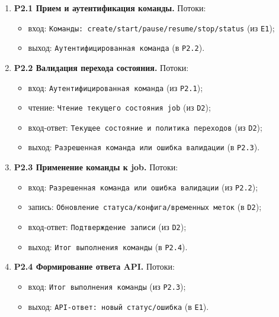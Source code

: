 ﻿\documentclass[14pt,a4paper]{extarticle}
\begin{document}
\begin{enumerate}
  \item \textbf{P2.1 Прием и аутентификация команды.}
  Потоки:
  \begin{itemize}
    \item вход: \texttt{Команды: create/start/pause/resume/stop/status} (из \texttt{E1});
    \item выход: \texttt{Аутентифицированная команда} (в \texttt{P2.2}).
  \end{itemize}
  \item \textbf{P2.2 Валидация перехода состояния.}
  Потоки:
  \begin{itemize}
    \item вход: \texttt{Аутентифицированная команда} (из \texttt{P2.1});
    \item чтение: \texttt{Чтение текущего состояния job} (из \texttt{D2});
    \item вход-ответ: \texttt{Текущее состояние и политика переходов} (из \texttt{D2});
    \item выход: \texttt{Разрешенная команда или ошибка валидации} (в \texttt{P2.3}).
  \end{itemize}
  \item \textbf{P2.3 Применение команды к job.}
  Потоки:
  \begin{itemize}
    \item вход: \texttt{Разрешенная команда или ошибка валидации} (из \texttt{P2.2});
    \item запись: \texttt{Обновление статуса/конфига/временных меток} (в \texttt{D2});
    \item вход-ответ: \texttt{Подтверждение записи} (из \texttt{D2});
    \item выход: \texttt{Итог выполнения команды} (в \texttt{P2.4}).
  \end{itemize}
  \item \textbf{P2.4 Формирование ответа API.}
  Потоки:
  \begin{itemize}
    \item вход: \texttt{Итог выполнения команды} (из \texttt{P2.3});
    \item выход: \texttt{API-ответ: новый статус/ошибка} (в \texttt{E1}).
  \end{itemize}
\end{enumerate}
\end{document}
